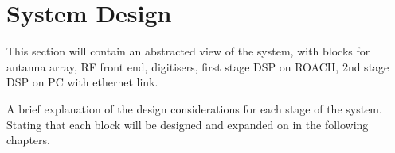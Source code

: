 \chapter{System Design}
\label{ch:system-design}

This section will contain an abstracted view of the system, with blocks for antanna array, RF front end, digitisers, first stage DSP on ROACH, 2nd stage DSP on PC with ethernet link.

A brief explanation of the design considerations for each stage of the system. Stating that each block will be designed and expanded on in the following chapters.
